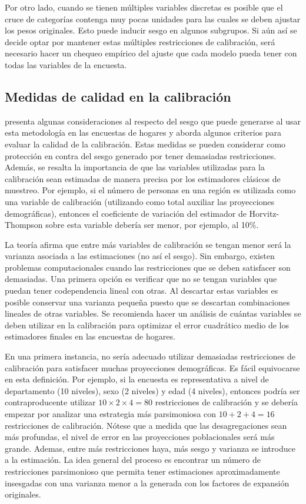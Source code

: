 \documentclass[
  12pt,
  spanish,
]{book}
\begin{document}
Por otro lado, cuando se tienen múltiples variables discretas es posible que el cruce de categorías contenga muy pocas unidades para las cuales se deben ajustar los pesos originales. Esto puede inducir sesgo en algunos subgrupos. Si aún así se decide optar por mantener estas múltiples restricciones de calibración, será necesario hacer un chequeo empírico del ajuste que cada modelo pueda tener con todas las variables de la encuesta.

\hypertarget{medidas-de-calidad-en-la-calibraciuxf3n}{%
\subsection{Medidas de calidad en la calibración}\label{medidas-de-calidad-en-la-calibraciuxf3n}}

\citet{Silva_2004} presenta algunas consideraciones al respecto del sesgo que puede generarse al usar esta metodología en las encuestas de hogares y aborda algunos criterios para evaluar la calidad de la calibración. Estas medidas se pueden considerar como protección en contra del sesgo generado por tener demasiadas restricciones. Además, se resalta la importancia de que las variables utilizadas para la calibración sean estimadas de manera precisa por los estimadores clásicos de muestreo. Por ejemplo, si el número de personas en una región es utilizada como una variable de calibración (utilizando como total auxiliar las proyecciones demográficas), entonces el coeficiente de variación del estimador de Horvitz-Thompson sobre esta variable debería ser menor, por ejemplo, al 10\%.

La teoría afirma que entre más variables de calibración se tengan menor será la varianza asociada a las estimaciones (no así el sesgo). Sin embargo, existen problemas computacionales cuando las restricciones que se deben satisfacer son demasiadas. Una primera opción es verificar que no se tengan variables que puedan tener codependencia lineal con otras. Al descartar estas variables es posible conservar una varianza pequeña puesto que se descartan combinaciones lineales de otras variables. Se recomienda hacer un análisis de cuántas variables se deben utilizar en la calibración para optimizar el error cuadrático medio de los estimadores finales en las encuestas de hogares.

En una primera instancia, no sería adecuado utilizar demasiadas restricciones de calibración para satisfacer muchas proyecciones demográficas. Es fácil equivocarse en esta definición. Por ejemplo, si la encuesta es representativa a nivel de departamento (10 niveles), sexo (2 niveles) y edad (4 niveles), entonces podría ser contraproducente utilizar \(10 \times 2 \times 4 = 80\) restricciones de calibración y se debería empezar por analizar una estrategia más parsimoniosa con \(10 + 2 + 4 = 16\) restricciones de calibración. Nótese que a medida que las desagregaciones sean más profundas, el nivel de error en las proyecciones poblacionales será más grande. Ademas, entre más restricciones haya, más sesgo y varianza se introduce a la estimación. La idea general del proceso es encontrar un número de restricciones parsimonioso que permita tener estimaciones aproximadamente insesgadas con una varianza menor a la generada con los factores de expansión originales.
\end{document}
